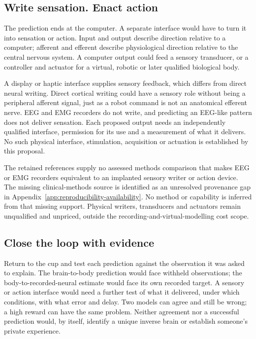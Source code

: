 \subsection{Write sensation. Enact action}
The prediction ends at the computer. A separate interface would have to turn
it into sensation or action. Input and output describe direction relative to
a computer; afferent and efferent describe physiological direction relative
to the central nervous system. A computer output could feed a sensory
transducer, or a controller and actuator for a virtual, robotic or later
qualified biological body.

A display or haptic interface supplies sensory feedback, which differs from direct neural writing. Direct cortical writing could have a sensory role without being a peripheral afferent signal, just as a robot command is not an anatomical efferent nerve. EEG and EMG recorders do not write, and predicting an EEG-like pattern does not deliver sensation. Each proposed output needs an independently qualified interface, permission for its use and a measurement of what it delivers. No such physical interface, stimulation, acquisition or actuation is established by this proposal.

The retained references supply no assessed methods comparison that makes EEG or EMG recorders equivalent to an implanted sensory writer or action device. The missing clinical-methods source is identified as an unresolved provenance gap in Appendix~\ref{app:reproducibility-availability}. No method or capability is inferred from that missing support. Physical writers, transducers and actuators remain unqualified and unpriced, outside the recording-and-virtual-modelling cost scope.

\subsection{Close the loop with evidence}
Return to the cup and test each prediction against the observation it was
asked to explain. The brain-to-body prediction would face withheld observations;
the body-to-recorded-neural estimate would face its own recorded target.
A sensory or action interface would need a further test of what it delivered,
under which conditions, with what error and delay. Two models can agree and
still be wrong; a high reward can have the same problem. Neither agreement nor
a successful prediction would, by itself, identify a unique inverse brain or
establish someone's private experience.

